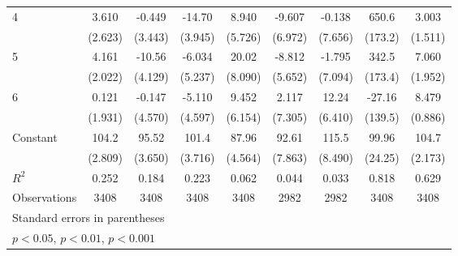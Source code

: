 \documentclass{article}
\begin{document}
{\begin{longtable}{l*{8}{c}}
4               &    3.610         &   -0.449         &   -14.70\sym{**} &    8.940         &   -9.607         &   -0.138         &    650.6\sym{**} &    3.003         \\
                &  (2.623)         &  (3.443)         &  (3.945)         &  (5.726)         &  (6.972)         &  (7.656)         &  (173.2)         &  (1.511)         \\
5               &    4.161         &   -10.56\sym{*}  &   -6.034         &    20.02\sym{*}  &   -8.812         &   -1.795         &    342.5         &    7.060\sym{**} \\
                &  (2.022)         &  (4.129)         &  (5.237)         &  (8.090)         &  (5.652)         &  (7.094)         &  (173.4)         &  (1.952)         \\
6               &    0.121         &   -0.147         &   -5.110         &    9.452         &    2.117         &    12.24         &   -27.16         &    8.479\sym{***}\\
                &  (1.931)         &  (4.570)         &  (4.597)         &  (6.154)         &  (7.305)         &  (6.410)         &  (139.5)         &  (0.886)         \\
Constant        &    104.2\sym{***}&    95.52\sym{***}&    101.4\sym{***}&    87.96\sym{***}&    92.61\sym{***}&    115.5\sym{***}&    99.96\sym{***}&    104.7\sym{***}\\
                &  (2.809)         &  (3.650)         &  (3.716)         &  (4.564)         &  (7.863)         &  (8.490)         &  (24.25)         &  (2.173)         \\
\hline
\(R^{2}\)       &    0.252         &    0.184         &    0.223         &    0.062         &    0.044         &    0.033         &    0.818         &    0.629         \\
Observations    &     3408         &     3408         &     3408         &     3408         &     2982         &     2982         &     3408         &     3408         \\
\hline\hline
\multicolumn{9}{l}{\footnotesize Standard errors in parentheses}\\
\multicolumn{9}{l}{\footnotesize \sym{*} \(p<0.05\), \sym{**} \(p<0.01\), \sym{***} \(p<0.001\)}\\
\end{longtable}
}
\end{document}
